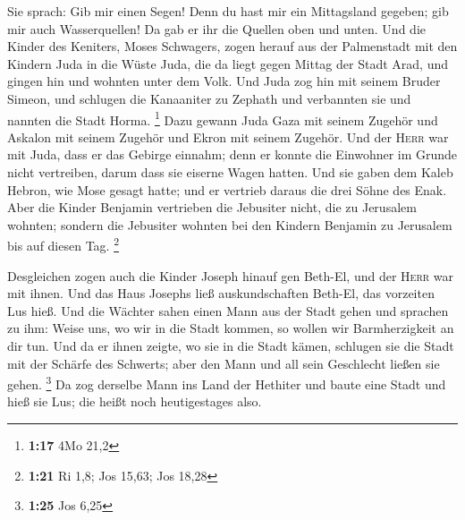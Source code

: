  Sie sprach: Gib mir einen Segen! Denn du hast mir ein
Mittagsland gegeben; gib mir auch Wasserquellen! Da gab er ihr die
Quellen oben und unten.  Und die Kinder des Keniters,
Moses Schwagers, zogen herauf aus der Palmenstadt mit den Kindern Juda
in die Wüste Juda, die da liegt gegen Mittag der Stadt Arad, und gingen
hin und wohnten unter dem Volk.  Und Juda zog hin mit
seinem Bruder Simeon, und schlugen die Kanaaniter zu Zephath und
verbannten sie und nannten die Stadt Horma. \footnote{\textbf{1:17} 4Mo
  21,2}  Dazu gewann Juda Gaza mit seinem Zugehör und
Askalon mit seinem Zugehör und Ekron mit seinem Zugehör. 
Und der \textsc{Herr} war mit Juda, dass er das Gebirge einnahm; denn er
konnte die Einwohner im Grunde nicht vertreiben, darum dass sie eiserne
Wagen hatten.  Und sie gaben dem Kaleb Hebron, wie Mose
gesagt hatte; und er vertrieb daraus die drei Söhne des Enak.
 Aber die Kinder Benjamin vertrieben die Jebusiter nicht,
die zu Jerusalem wohnten; sondern die Jebusiter wohnten bei den Kindern
Benjamin zu Jerusalem bis auf diesen Tag. \footnote{\textbf{1:21} Ri
  1,8; Jos 15,63; Jos 18,28}

 Desgleichen zogen auch die Kinder Joseph hinauf gen
Beth-El, und der \textsc{Herr} war mit ihnen.  Und das
Haus Josephs ließ auskundschaften Beth-El, das vorzeiten Lus hieß.
 Und die Wächter sahen einen Mann aus der Stadt gehen und
sprachen zu ihm: Weise uns, wo wir in die Stadt kommen, so wollen wir
Barmherzigkeit an dir tun.  Und da er ihnen zeigte, wo
sie in die Stadt kämen, schlugen sie die Stadt mit der Schärfe des
Schwerts; aber den Mann und all sein Geschlecht ließen sie gehen.
\footnote{\textbf{1:25} Jos 6,25}  Da zog derselbe Mann
ins Land der Hethiter und baute eine Stadt und hieß sie Lus; die heißt
noch heutigestages also.

